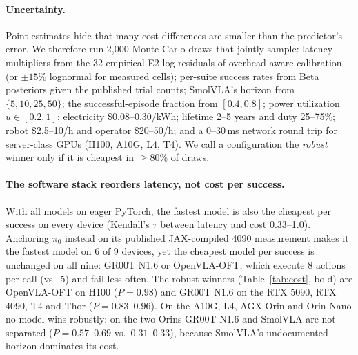 \documentclass[10pt]{article}
\begin{document}
\paragraph{Uncertainty.} Point estimates hide that many cost differences are smaller than the
predictor's error. We therefore run 2{,}000 Monte Carlo draws that jointly sample: latency
multipliers from the 32 empirical E2 log-residuals of overhead-aware calibration (or
$\pm15\%$ lognormal for measured cells); per-suite success rates from Beta posteriors given the
published trial counts; SmolVLA's horizon from $\{5,10,25,50\}$; the successful-episode fraction
from $[0.4,0.8]$; power utilization $u\in[0.2,1]$; electricity \$0.08--0.30/kWh; lifetime 2--5
years and duty 25--75\%; robot \$2.5--10/h and operator \$20--50/h; and a 0--30\,ms network round
trip for server-class GPUs (H100, A10G, L4, T4). We call a configuration the \emph{robust} winner
only if it is cheapest in $\ge80\%$ of draws.

\begin{table}[t]\centering\small\setlength{\tabcolsep}{3pt}

\caption{Dollars per 1{,}000 successful LIBERO episodes (point estimates; synchronous execution,
mean over four suites). SR: average success rate (\%). \textbf{Bold}: cheapest model on that device
in $\ge$80\% of Monte Carlo draws; \underline{underline}: cheapest device for that model in
$\ge$80\% of draws; unmarked columns/rows have no robust winner. --: does not fit in device
memory.}\label{tab:cost}
\end{table}

\begin{table}[t]\centering\small\setlength{\tabcolsep}{3.5pt}

\caption{Per-call latency (ms, bf16, eager PyTorch). *: published measurement; others: overhead-
calibrated prediction. $^\dagger$: not real-time in asynchronous mode at 20\,Hz ($\ell > H/f$),
so the robot stalls between chunks.}\label{tab:latency}
\end{table}

\paragraph{The software stack reorders latency, not cost per success.} With all models on eager
PyTorch, the fastest model is also the cheapest per success on every device (Kendall's $\tau$
between latency and cost 0.33--1.0). Anchoring $\pi_0$ instead on its published JAX-compiled
4090 measurement makes it the fastest model on 6 of 9 devices, yet the cheapest model per success
is unchanged on all nine: GR00T N1.6 or OpenVLA-OFT, which execute 8 actions per call (vs.\ 5)
and fail less often. The robust winners (Table~\ref{tab:cost}, bold) are OpenVLA-OFT on H100
($P{=}0.98$) and GR00T N1.6 on the RTX 5090, RTX 4090, T4 and Thor ($P{=}0.83$--$0.96$). On the
A10G, L4, AGX Orin and Orin Nano no model wins robustly; on the two Orins GR00T N1.6 and SmolVLA
are not separated ($P{=}0.57$--$0.69$ vs.\ $0.31$--$0.33$), because SmolVLA's undocumented horizon
dominates its cost.
\end{document}
